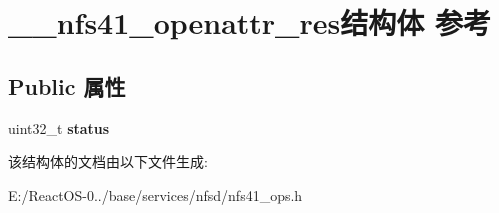 \hypertarget{struct____nfs41__openattr__res}{}\section{\+\_\+\+\_\+nfs41\+\_\+openattr\+\_\+res结构体 参考}
\label{struct____nfs41__openattr__res}
\subsection*{Public 属性}
\begin{DoxyCompactItemize}
\item 
\mbox{\label{struct____nfs41__openattr__res_a588b3b3b75814b7abc0995a879c79efb}} 
uint32\+\_\+t {\bfseries status}
\end{DoxyCompactItemize}


该结构体的文档由以下文件生成\+:\begin{DoxyCompactItemize}
\item 
E\+:/\+React\+O\+S-\/0../base/services/nfsd/nfs41\+\_\+ops.\+h\end{DoxyCompactItemize}
